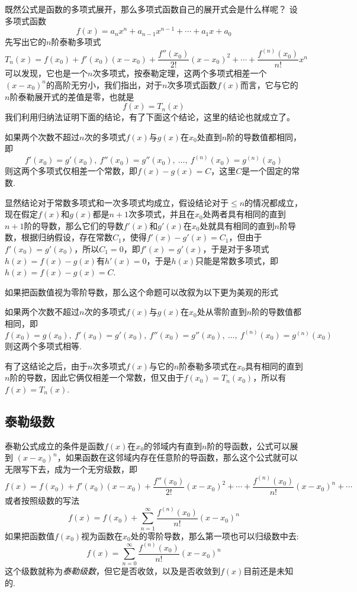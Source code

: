 \begin{example}
  既然公式是函数的多项式展开，那么多项式函数自己的展开式会是什么样呢？ 设多项式函数
  \[ f(x) = a_nx^n+a_{n-1}x^{n-1}+\cdots+a_1x+a_0 \]
  先写出它的$n$阶泰勒多项式
\[ T_n(x) = f(x_0) + f'(x_0)(x-x_0)+\frac{f''(x_0)}{2!}(x-x_0)^2+ \cdots +\frac{f^{(n)}(x_0)}{n!}x^n \]
可以发现，它也是一个$n$次多项式，按泰勒定理，这两个多项式相差一个$(x-x_0)^n$的高阶无穷小，我们指出，对于$n$次多项式函数$f(x)$而言，它与它的$n$阶泰勒展开式的差值是零，也就是
\[ f(x) = T_n(x) \]
我们利用归纳法证明下面的结论，有了下面这个结论，这里的结论也就成立了。

\begin{statement}
  如果两个次数不超过$n$次的多项式$f(x)$与$g(x)$在$x_0$处直到$n$阶的导数值都相同，即
  \[ f'(x_0) = g'(x_0), \  f''(x_0) = g''(x_0), \  \ldots, \  f^{(n)}(x_0) = g^{(n)}(x_0) \]
  则这两个多项式仅相差一个常数，即$f(x)-g(x)=C$，这里$C$是一个固定的常数.
\end{statement}

显然结论对于常数多项式和一次多项式均成立，假设结论对于$\leqslant n$的情况都成立，现在假定$f(x)$和$g(x)$都是$n+1$次多项式，并且在$x_0$处两者具有相同的直到$n+1$阶的导数，那么它们的导数$f'(x)$和$g'(x)$在$x_0$处就具有相同的直到$n$阶导数，根据归纳假设，存在常数$C_1$，使得$f'(x)-g'(x)=C_1$，但由于$f'(x_0)=g'(x_0)$，所以$C_1=0$，即$f'(x)=g'(x)$，于是对于多项式$h(x)=f(x)-g(x)$有$h'(x)=0$，于是$h(x)$只能是常数多项式，即$h(x)=f(x)-g(x)=C$.
\end{example}

如果把函数值视为零阶导数，那么这个命题可以改叙为以下更为美观的形式
\begin{statement}
  如果两个次数不超过$n$次的多项式$f(x)$与$g(x)$在$x_0$处从零阶直到$n$阶的导数值都相同，即
  \[ f(x_0)=g(x_0), \  f'(x_0) = g'(x_0), \  f''(x_0) = g''(x_0), \  \ldots, \  f^{(n)}(x_0) = g^{(n)}(x_0) \]
  则这两个多项式相等.
\end{statement}

有了这结论之后，由于$n$次多项式$f(x)$与它的$n$阶泰勒多项式在$x_0$具有相同的直到$n$阶的导数，因此它俩仅相差一个常数，但又由于$f(x_0)=T_n(x_0)$，所以有$f(x)=T_n(x)$.

\subsection{泰勒级数}
\label{sec:taylor-series}

泰勒公式成立的条件是函数$f(x)$在$x_0$的邻域内有直到$n$阶的导函数，公式可以展到 $(x-x_0)^n$，如果函数在这邻域内存在任意阶的导函数，那么这个公式就可以无限写下去，成为一个无穷级数，即
\[ f(x) = f(x_0) + f'(x_0)(x-x_0)+\frac{f''(x_0)}{2!}(x-x_0)^2+\cdots+\frac{f^{(n)}(x_0)}{n!}(x-x_0)^n+\cdots \]
或者按照级数的写法
\[ f(x) = f(x_0) + \sum_{n=1}^{\infty} \frac{f^{(n)}(x_0)}{n!}(x-x_0)^n \]
如果把函数值$f(x_0)$视为函数在$x_0$处的零阶导数，那么第一项也可以归级数中去:
\[ f(x) = \sum_{n=0}^{\infty} \frac{f^{(n)}(x_0)}{n!}(x-x_0)^n \]
这个级数就称为\emph{泰勒级数}，但它是否收敛，以及是否收敛到$f(x)$目前还是未知的.

